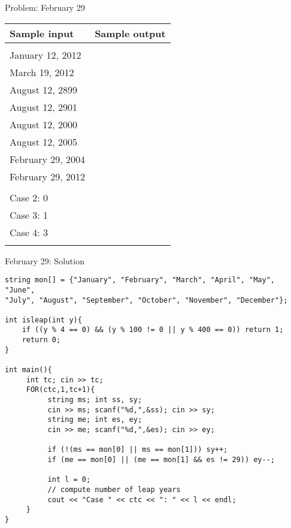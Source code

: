 \documentclass[12pt,t]{beamer}
\begin{document}
\begin{frame}{Problem: February 29}
    \vspace{10pt}

    \begin{center}
        \begin{tabular}{|l|l|}
            \hline
            {\footnotesize Sample input} & {\footnotesize Sample output} \\
            \hline
            \begin{minipage}{150pt}
\vspace{10pt}
\ttfamily
4\\
January 12, 2012\\
March 19, 2012\\
August 12, 2899\\
August 12, 2901\\
August 12, 2000\\
August 12, 2005\\
February 29, 2004\\
February 29, 2012\\
            \end{minipage}
&
\begin{minipage}{100pt}
\vspace{10pt}
\ttfamily
Case 1: 1\\
Case 2: 0\\
Case 3: 1\\
Case 4: 3\\
\end{minipage}
\\
            \hline
        \end{tabular}
    \end{center}
\end{frame}


\begin{frame}[fragile]{February 29: Solution}
    \begin{verbatim}
string mon[] = {"January", "February", "March", "April", "May", "June",
"July", "August", "September", "October", "November", "December"};

int isleap(int y){
    if ((y % 4 == 0) && (y % 100 != 0 || y % 400 == 0)) return 1;
    return 0;
}

int main(){
     int tc; cin >> tc;
     FOR(ctc,1,tc+1){
          string ms; int ss, sy;
          cin >> ms; scanf("%d,",&ss); cin >> sy;
          string me; int es, ey;
          cin >> me; scanf("%d,",&es); cin >> ey;

          if (!(ms == mon[0] || ms == mon[1])) sy++;
          if (me == mon[0] || (me == mon[1] && es != 29)) ey--;
          
          int l = 0;
          // compute number of leap years
          cout << "Case " << ctc << ": " << l << endl;
     }
}\end{verbatim}
\end{frame}
\end{document}
